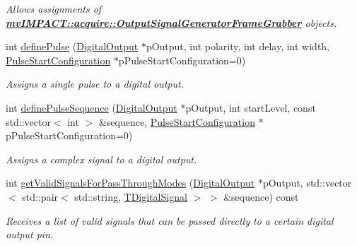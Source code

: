 \begin{DoxyCompactItemize}
\begin{DoxyCompactList}\small\item\em Allows assignments of {\bfseries \hyperlink{classmv_i_m_p_a_c_t_1_1acquire_1_1_output_signal_generator_frame_grabber}{mv\+I\+M\+P\+A\+C\+T\+::acquire\+::\+Output\+Signal\+Generator\+Frame\+Grabber}} objects. \end{DoxyCompactList}\item 
int \hyperlink{classmv_i_m_p_a_c_t_1_1acquire_1_1_output_signal_generator_frame_grabber_ad184bc7320099f53b9859e42c30da858}{define\+Pulse} (\hyperlink{classmv_i_m_p_a_c_t_1_1acquire_1_1_digital_output}{Digital\+Output} $\ast$p\+Output, int polarity, int delay, int width, \hyperlink{classmv_i_m_p_a_c_t_1_1acquire_1_1_pulse_start_configuration}{Pulse\+Start\+Configuration} $\ast$p\+Pulse\+Start\+Configuration=0)
\begin{DoxyCompactList}\small\item\em Assigns a single pulse to a digital output. \end{DoxyCompactList}\item 
int \hyperlink{classmv_i_m_p_a_c_t_1_1acquire_1_1_output_signal_generator_frame_grabber_a10d99336c129dae39d28b1c53795f00e}{define\+Pulse\+Sequence} (\hyperlink{classmv_i_m_p_a_c_t_1_1acquire_1_1_digital_output}{Digital\+Output} $\ast$p\+Output, int start\+Level, const std\+::vector$<$ int $>$ \&sequence, \hyperlink{classmv_i_m_p_a_c_t_1_1acquire_1_1_pulse_start_configuration}{Pulse\+Start\+Configuration} $\ast$p\+Pulse\+Start\+Configuration=0)
\begin{DoxyCompactList}\small\item\em Assigns a complex signal to a digital output. \end{DoxyCompactList}\item 
int \hyperlink{classmv_i_m_p_a_c_t_1_1acquire_1_1_output_signal_generator_frame_grabber_ae53d34b33acf4b256f3b0d27bdf2dd26}{get\+Valid\+Signals\+For\+Pass\+Through\+Modes} (\hyperlink{classmv_i_m_p_a_c_t_1_1acquire_1_1_digital_output}{Digital\+Output} $\ast$p\+Output, std\+::vector$<$ std\+::pair$<$ std\+::string, \hyperlink{group___device_specific_interface_ga29840a466892bced617a5f3a6edb5218}{T\+Digital\+Signal} $>$ $>$ \&sequence) const 
\begin{DoxyCompactList}\small\item\em Receives a list of valid signals that can be passed directly to a certain digital output pin. \end{DoxyCompactList}\item 

\end{DoxyCompactItemize}
